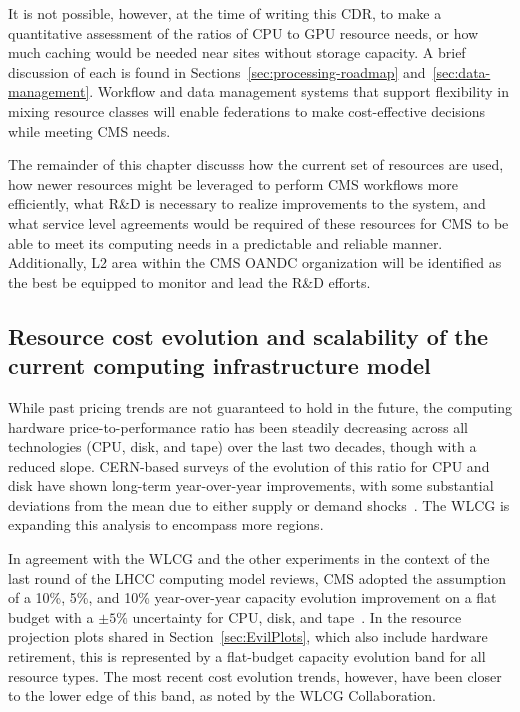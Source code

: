It is not possible, however, at the time of writing this \gls{CDR}, to make a quantitative assessment of the ratios of \gls{CPU} to \gls{GPU} resource needs, or how much caching would be needed near sites without storage capacity. A brief discussion of each is found in Sections~\ref{sec:processing-roadmap} and~\ref{sec:data-management}. Workflow and data management systems that support flexibility in mixing resource classes will enable federations to make cost-effective decisions while meeting CMS needs.

The remainder of this chapter discusss how the current set of resources are used, how newer resources might be leveraged to perform CMS workflows more efficiently, what R\&D is necessary to realize improvements to the system, and what service level agreements would be required of these resources for CMS to be able to meet its computing needs in a predictable and reliable manner. Additionally, L2 area within the CMS \gls{OANDC} organization will be identified as the best be equipped to monitor and lead the R\&D efforts.

\subsection{Resource cost evolution and scalability of the current computing infrastructure model}
\label{sec-scalabilty-old-model}

While past pricing trends are not guaranteed to hold in the future, the computing hardware price-to-performance ratio has been steadily decreasing across all technologies (\gls{CPU}, disk, and tape) over the last two decades, though with a reduced slope. CERN-based surveys of the evolution of this ratio for \gls{CPU} and disk have shown long-term year-over-year improvements, with some substantial deviations from the mean due to either supply or demand shocks~\cite{WLCG-evolution}. The \gls{WLCG} is expanding this analysis to encompass more regions.

In agreement with the \gls{WLCG} and the other experiments in the context of the last round of the \gls{LHCC} computing model reviews, CMS adopted the assumption of a 10\%, 5\%, and 10\% year-over-year capacity evolution improvement on a flat budget with a $\pm 5\%$ uncertainty for \gls{CPU}, disk, and tape~\cite{WLCG:2025scas}. In the resource projection plots shared in Section~\ref{sec:EvilPlots}, which also include hardware retirement, this is represented by a flat-budget capacity evolution band for all resource types. The most recent cost evolution trends, however, have been closer to the lower edge of this band, as noted by the \gls{WLCG} Collaboration.

